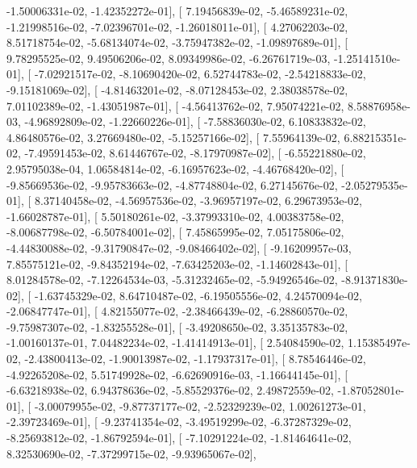 \documentclass{article}
\begin{document}
         -1.50006331e-02,  -1.42352272e-01],
       [  7.19456839e-02,  -5.46589231e-02,  -1.21998516e-02,
         -7.02396701e-02,  -1.26018011e-01],
       [  4.27062203e-02,   8.51718754e-02,  -5.68134074e-02,
         -3.75947382e-02,  -1.09897689e-01],
       [  9.78295525e-02,   9.49506206e-02,   8.09349986e-02,
         -6.26761719e-03,  -1.25141510e-01],
       [ -7.02921517e-02,  -8.10690420e-02,   6.52744783e-02,
         -2.54218833e-02,  -9.15181069e-02],
       [ -4.81463201e-02,  -8.07128453e-02,   2.38038578e-02,
          7.01102389e-02,  -1.43051987e-01],
       [ -4.56413762e-02,   7.95074221e-02,   8.58876958e-03,
         -4.96892809e-02,  -1.22660226e-01],
       [ -7.58836030e-02,   6.10833832e-02,   4.86480576e-02,
          3.27669480e-02,  -5.15257166e-02],
       [  7.55964139e-02,   6.88215351e-02,  -7.49591453e-02,
          8.61446767e-02,  -8.17970987e-02],
       [ -6.55221880e-02,   2.95795038e-04,   1.06584814e-02,
         -6.16957623e-02,  -4.46768420e-02],
       [ -9.85669536e-02,  -9.95783663e-02,  -4.87748804e-02,
          6.27145676e-02,  -2.05279535e-01],
       [  8.37140458e-02,  -4.56957536e-02,  -3.96957197e-02,
          6.29673953e-02,  -1.66028787e-01],
       [  5.50180261e-02,  -3.37993310e-02,   4.00383758e-02,
         -8.00687798e-02,  -6.50784001e-02],
       [  7.45865995e-02,   7.05175806e-02,  -4.44830088e-02,
         -9.31790847e-02,  -9.08466402e-02],
       [ -9.16209957e-03,   7.85575121e-02,  -9.84352194e-02,
         -7.63425203e-02,  -1.14602843e-01],
       [  8.01284578e-02,  -7.12264534e-03,  -5.31232465e-02,
         -5.94926546e-02,  -8.91371830e-02],
       [ -1.63745329e-02,   8.64710487e-02,  -6.19505556e-02,
          4.24570094e-02,  -2.06847747e-01],
       [  4.82155077e-02,  -2.38466439e-02,  -6.28860570e-02,
         -9.75987307e-02,  -1.83255528e-01],
       [ -3.49208650e-02,   3.35135783e-02,  -1.00160137e-01,
          7.04482234e-02,  -1.41414913e-01],
       [  2.54084590e-02,   1.15385497e-02,  -2.43800413e-02,
         -1.90013987e-02,  -1.17937317e-01],
       [  8.78546446e-02,  -4.92265208e-02,   5.51749928e-02,
         -6.62690916e-03,  -1.16644145e-01],
       [ -6.63218938e-02,   6.94378636e-02,  -5.85529376e-02,
          2.49872559e-02,  -1.87052801e-01],
       [ -3.00079955e-02,  -9.87737177e-02,  -2.52329239e-02,
          1.00261273e-01,  -2.39723469e-01],
       [ -9.23741354e-02,  -3.49519299e-02,  -6.37287329e-02,
         -8.25693812e-02,  -1.86792594e-01],
       [ -7.10291224e-02,  -1.81464641e-02,   8.32530690e-02,
         -7.37299715e-02,  -9.93965067e-02],
\end{document}
